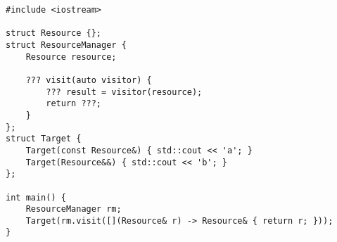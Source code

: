 \begin{lstlisting}[title=\href{https://godbolt.org/z/MzGGqc}{\texttt{godbolt.org/z/MzGGqc}}]
#include <iostream>

struct Resource {};
struct ResourceManager {
    Resource resource;

    ??? visit(auto visitor) {
        ??? result = visitor(resource);
        return ???;
    }
};
struct Target {
    Target(const Resource&) { std::cout << 'a'; }
    Target(Resource&&) { std::cout << 'b'; }
};

int main() {
    ResourceManager rm;
    Target(rm.visit([](Resource& r) -> Resource& { return r; }));
}
\end{lstlisting}
